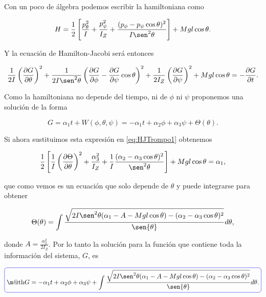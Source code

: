 \documentclass[a4paper,10pt]{article}
\makeatletter
\numberwithin{equation}{section}
\newcommand*{\boxcolor}{blue}
\renewcommand{\boxed}[1]{\textcolor{\boxcolor}{%
\tikz[baseline={([yshift=-1ex]current bounding box.center)}] \node [rectangle, minimum width=1ex,rounded corners,draw] {\normalcolor\m@th$\displaystyle#1$};}}
\makeatother
\begin{document}
Con un poco de álgebra podemos escribir la hamiltoniana como 

\begin{equation}
 H = \frac{1}{2}\left[\frac{p_\theta^2}{I} + \frac{p_\psi^2}{I_Z} 
 + \frac{(p_\phi - p_\psi\cos{\theta})^2}{I\sen^2{\theta}}\right] + 
 Mgl\cos{\theta}.
\end{equation}

Y la ecuación de Hamilton-Jacobi será entonces 

\begin{equation}
 \frac{1}{2I}\left(\frac{\partial G}{\partial \theta} \right)^2 + 
 \frac{1}{2I\sen^2{\theta}}\left(\frac{\partial G}{\partial \phi} - 
 \frac{\partial G}{\partial \psi}\cos{\theta}\right)^2 + 
 \frac{1}{2I_Z}\left(\frac{\partial G}{\partial \psi} \right)^2 
 + Mgl\cos{\theta} = - \frac{\partial G}{\partial t}.
 \label{eq:HJTrompo1}
\end{equation}

Como la hamiltoniana no depende del tiempo, ni de $\phi$ ni $\psi$ proponemos 
una solución de la forma 

\begin{equation}
 G = \alpha_1t + W(\phi,\theta,\psi) = - \alpha_1t + \alpha_2\phi + \alpha_3\psi 
 + \Theta(\theta).
\end{equation}

Si ahora sustituimos esta expresión en \eqref{eq:HJTrompo1} obtenemos 

\begin{equation}
 \frac{1}{2}\left[\frac{1}{I}\left(\frac{\partial \Theta}{\partial \theta} \right)^2
 + \frac{\alpha_3^2}{I_Z} + \frac{1}{I}\frac{(\alpha_2 - \alpha_3\cos{\theta})^2}{\sen^2{\theta}}\right] 
 + Mgl\cos{\theta} = \alpha_1,
\end{equation}

que como vemos es un ecuación que solo depende de $\theta$ y puede integrarse 
para obtener 

\begin{equation}
 \Theta(\theta) = \int \frac{\sqrt{2I\sen^2{\theta}(\alpha_1 - A - 
 Mgl\cos{\theta}) - (\alpha_2 - \alpha_3\cos{\theta})^2}}{\sen{\theta}}d\theta,
\end{equation}

donde $A = \frac{\alpha_3^2}{2I_Z}$. Por lo tanto la solución para la función que 
contiene toda la información del sistema, $G$, es 

\begin{equation*}
 \boxed{G = -\alpha_1t + \alpha_2\phi + \alpha_3\psi + \int \frac{\sqrt{2I\sen^2{\theta}(\alpha_1 - A - 
 Mgl\cos{\theta}) - (\alpha_2 - \alpha_3\cos{\theta})^2}}{\sen{\theta}}d\theta.}
\end{equation*}
\end{document}
